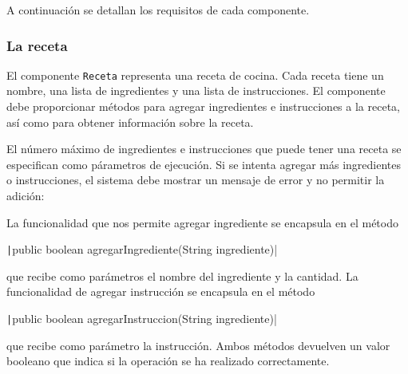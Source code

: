 \documentclass[
    a4paper, %
    12pt, %
]{CSSullivanBusinessReport}
\begin{document}
A continuación se detallan los requisitos de cada componente.

\subsubsection{La receta}\label{sec:receta}

El componente \texttt{Receta} representa una receta de cocina. Cada receta tiene un nombre, una lista de ingredientes y una lista de instrucciones. El componente debe proporcionar métodos para agregar ingredientes e instrucciones a la receta, así como para obtener información sobre la receta.

El número máximo de ingredientes e instrucciones que puede tener una receta se especifican como párametros de ejecución. Si se intenta agregar más ingredientes o instrucciones, el sistema debe mostrar un mensaje de error y no permitir la adición:


La funcionalidad que nos permite agregar ingrediente se encapsula en el método 

\texttt|public boolean agregarIngrediente(String ingrediente)|

que recibe como parámetros el nombre del ingrediente y la cantidad. La funcionalidad de agregar instrucción se encapsula en el método

\texttt|public boolean agregarInstruccion(String ingrediente)|

que recibe como parámetro la instrucción. Ambos métodos devuelven un valor booleano que indica si la operación se ha realizado correctamente.
\end{document}
